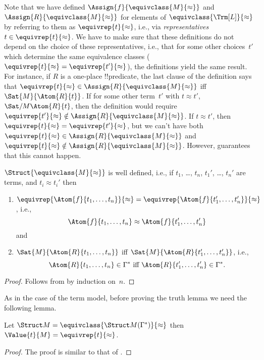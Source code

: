 \documentclass[../../../include/open-logic-section]{subfiles}
\begin{document}
\begin{explain}
Note that we have defined $\Assign{f}{\equivclass{M}{\approx}}$ and
$\Assign{R}{\equivclass{M}{\approx}}$ for elements of
$\equivclass{\Trm[L]}{\approx}$ by referring to them as
$\equivrep{t}{\approx}$, i.e., via \emph{representatives}~$t \in
\equivrep{t}{\approx}$.  We have to make sure that these definitions
do not depend on the choice of these representatives, i.e., that for
some other choices~$t'$ which determine the same equivalence classes
($\equivrep{t}{\approx} = \equivrep{t'}{\approx}$), the definitions
yield the same result. For instance, if $R$ is a one-place
!!{predicate}, the last clause of the definition says that
$\equivrep{t}{\approx} \in \Assign{R}{\equivclass{M}{\approx}}$ iff
$\Sat{M}{\Atom{R}{t}}$. If for some other term~$t'$ with $t \approx
t'$, $\Sat/{M}{\Atom{R}{t}}$, then the definition would require
$\equivrep{t'}{\approx} \notin \Assign{R}{\equivclass{M}{\approx}}$.
If $t \approx t'$, then $\equivrep{t}{\approx} =
\equivrep{t'}{\approx}$, but we can't have both $\equivrep{t}{\approx}
\in \Assign{R}{\equivclass{M}{\approx}}$ and $\equivrep{t}{\approx}
\notin \Assign{R}{\equivclass{M}{\approx}}$.  However,
 guarantees that this cannot happen.
\end{explain}

\begin{prop}
$\Struct{\equivclass{M}{\approx}}$ is well defined, i.e., if $t_1$,
  \dots, $t_n$, $t_1'$, \dots, $t_n'$ are terms, and $t_i \approx
  t_i'$ then
\begin{enumerate}
\item $\equivrep{\Atom{f}{t_1,\dots, t_n}}{\approx} =
    \equivrep{\Atom{f}{t_1',\dots, t_n'}}{\approx}$, i.e.,
  \[
  \Atom{f}{t_1,\dots, t_n} \approx \Atom{f}{t_1',\dots, t_n'}
  \]
  and
\item $\Sat{M}{\Atom{R}{t_1,\dots, t_n}}$ iff
  $\Sat{M}{\Atom{R}{t_1',\dots, t_n'}}$, i.e.,
  \[
    \Atom{R}{t_1,\dots, t_n} \in \Gamma^* \text{ iff }
    \Atom{R}{t_1',\dots, t_n'} \in \Gamma^*.
  \]
\end{enumerate}
\end{prop}

\begin{proof}
Follows from  by induction on~$n$.
\end{proof}

As in the case of the term model, before proving the truth lemma we need 
the following lemma.

\begin{lem} 
Let $\Struct M = \equivclass{\Struct M(\Gamma^*)}{\approx}$ then 
$\Value{t}{M} = \equivrep{t}{\approx}$.
\end{lem}
\begin{proof}
The proof is similar to that of .
\end{proof}
\end{document}
